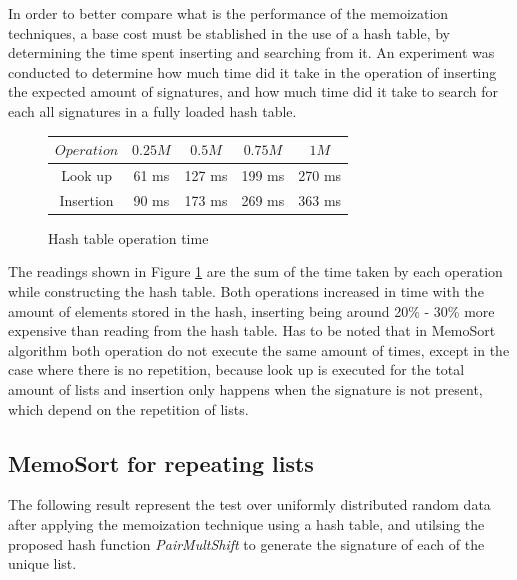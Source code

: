 \documentclass[a4paper,12pt]{article}
\begin{document}
In order to better compare what is the performance of the memoization techniques, a base cost must be stablished in the use of a hash table, by determining the time spent inserting and searching from it. An experiment was conducted to determine how much time did it take in the operation of inserting the expected amount of signatures, and how much time did it take to search for each all signatures in a fully loaded hash table. \\

\begin{figure}[H]
\centering
\begin{tabular}{|c|c|c|c|c|}  \toprule
	{$Operation$} & {$0.25M$} & {$0.5M$} & {$0.75M$} & {$1M$} \\ \midrule
	Look up & 61 ms & 127 ms& 199 ms & 270 ms\\ 
	Insertion & 90 ms & 173 ms& 269 ms& 363 ms\\ \bottomrule
\end{tabular}
\caption{Hash table operation time}
\label{ref:MemCostTable}
\end{figure}

The readings shown in Figure \ref{ref:MemCostTable} are the sum of the time taken by each operation while constructing the hash table. Both operations increased in time with the amount of elements stored in the hash, inserting being around 20\% - 30\% more expensive than reading from the hash table. Has to be noted that in MemoSort algorithm both operation do not execute the same amount of times, except in the case where there is no repetition, because look up is executed for the total amount of lists and insertion only happens when the signature is not present, which depend on the repetition of lists.

\subsection{MemoSort for repeating lists}

The following result represent the test over uniformly distributed random data after applying the memoization technique using a hash table, and utilsing the proposed hash function {\it PairMultShift}  to generate the signature of each of the unique list. \\

\end{document}
